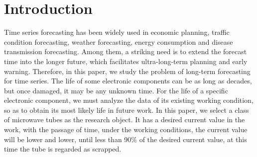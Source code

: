 \section{Introduction}
\label{sec:intro}

Time series forecasting has been widely used in economic planning, traffic condition forecasting, weather forecasting, energy consumption and disease transmission forecasting. Among them, a striking need is to extend the forecast time into the longer future, which facilitates ultra-long-term planning and early warning. Therefore, in this paper, we study the problem of long-term forecasting for time series. The life of some electronic components can be as long as decades, but once damaged, it may be any unknown time. For the life of a specific electronic component, we must analyze the data of its existing working condition, so as to obtain its most likely life in future work. In this paper, we select a class of microwave tubes as the research object. It has a desired current value in the work, with the passage of time, under the working conditions, the current value will be lower and lower, until less than 90\% of the desired current value, at this time the tube is regarded as scrapped.
%
%
%
%
